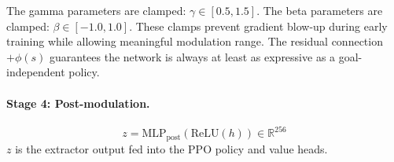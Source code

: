\documentclass[11pt,a4paper]{article}
\begin{document}
The gamma parameters are clamped: $\gamma \in [0.5, 1.5]$.
The beta parameters are clamped: $\beta \in [-1.0, 1.0]$.
These clamps prevent gradient blow-up during early training while allowing meaningful modulation range.
The residual connection $+\phi(s)$ guarantees the network is always at least as expressive as a goal-independent policy.

\paragraph{Stage 4: Post-modulation.}
\begin{equation}
z = \text{MLP}_{\text{post}}(\text{ReLU}(h)) \in \mathbb{R}^{256}
\end{equation}
$z$ is the extractor output fed into the PPO policy and value heads.
\end{document}
